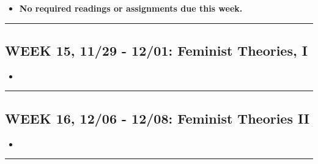 \documentclass[11pt,]{article}
\providecommand{\tightlist}{%
  \setlength{\itemsep}{0pt}\setlength{\parskip}{0pt}}
\begin{document}
\begin{itemize}
\tightlist
\item
  \textcolor{BurntOrange}{\bf{No required readings or assignments due this week.}}
\end{itemize}

\bigbreak
\hrule

\hypertarget{week-15-1129---1201-feminist-theories-i}{%
\subsection{WEEK 15, 11/29 - 12/01: Feminist Theories,
I}\label{week-15-1129---1201-feminist-theories-i}}

\begin{itemize}
\tightlist
\item
\end{itemize}

\bigbreak
\hrule

\hypertarget{week-16-1206---1208-feminist-theories-ii}{%
\subsection{WEEK 16, 12/06 - 12/08: Feminist Theories
II}\label{week-16-1206---1208-feminist-theories-ii}}

\begin{itemize}
\tightlist
\item
\end{itemize}

\bigbreak
\hrule
\end{document}

